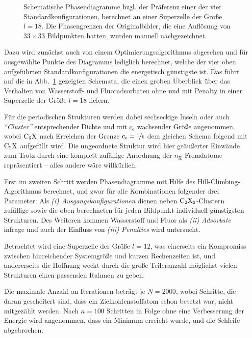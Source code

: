 \documentclass[a4paper, 10pt, twoside, openany]{book} %
\def \nX {n_\mathrm{X}}
\def \cE {c_\mathrm{e}}
\begin{document}
\begin{figure}
\begin{minipage}[b]{0.48\textwidth}
		\end{minipage}
		\caption[Präferenz einer der vier Standardkonfigurationen]{Schematische Phasendiagramme bzgl. der Präferenz einer der vier Standardkonfigurationen, berechnet an einer Superzelle der Größe $l = 18$. Die Phasengrenzen der Originalbilder, die eine Auflösung von $33 \times 33$ Bildpunkten hatten, wurden manuell nachgezeichnet.}
		\label{Schemata}
	\end{figure}
	Dazu wird zunächst auch von einem Optimierungsalgorithmus abgesehen und für ausgewählte Punkte des Diagramms lediglich berechnet, welche der vier oben aufgeführten Standardkonfigurationen die energetisch günstigste ist. Das führt auf die in Abb.~\ref{Schemata} gezeigten Schemata, die einen groben Überblick über das Verhalten von Wasserstoff- und Fluoradsorbaten ohne und mit Penalty in einer Superzelle der Größe $l = 18$ liefern.
	
	Für die periodischen Strukturen werden dabei sechseckige Inseln oder auch \emph{"`Cluster"'} entsprechender Dichte und mit $\cE$ wachsender Größe angenommen, wobei $\rm C_6X$ nach Erreichen der Grenze $\cE = \nicefrac 1 6$ dem gleichen Schema folgend mit $\rm C_2X$ aufgefüllt wird. Die ungeordnete Struktur wird hier geäußerter Einwände zum Trotz durch eine komplett zufällige Anordnung der $\nX$ Fremdatome repräsentiert -- alles andere wäre willkürlich.
	
	Erst im zweiten Schritt werden Phasendiagramme mit Hilfe des Hill-Climbing-Algorithmus berechnet, und zwar für alle Kombinationen folgender drei Parameter: Als \emph{(i) Ausgangskonfigurationen} dienen neben $\rm C_2X_2$-Clustern zufällige sowie die oben berechneten für jeden Bildpunkt individuell günstigsten Strukturen. Des Weiteren kommen Wasserstoff und Fluor als \emph{(ii) Adsorbate} infrage und auch der Einfluss von \emph{(iii) Penalties} wird untersucht.
	
	Betrachtet wird eine Superzelle der Größe $l = 12$, was einerseits ein Kompromiss zwischen hinreichender Systemgröße und kurzen Rechenzeiten ist, und andererseits die Hoffnung weckt durch die große Teileranzahl möglichst vielen Strukturen einen passenden Rahmen zu geben.
	
	Die maximale Anzahl an Iterationen beträgt je $N = 2000$, wobei Schritte, die daran gescheitert sind, dass ein Zielkohlenstoffatom schon besetzt war, nicht mitgezählt werden. Nach $n = 100$ Schritten in Folge ohne eine Verbesserung der Energie wird angenommen, dass ein Minimum erreicht wurde, und die Schleife abgebrochen.
	
\end{document}
